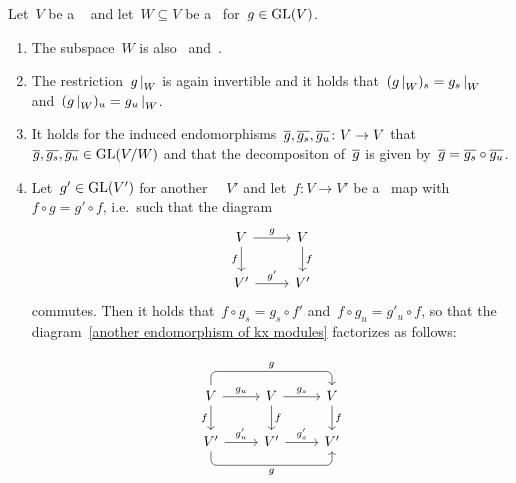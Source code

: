 \begin{lemma}
  \label{properties of mjcd}
  Let~$V$ be a {\fd}~{\kvs} and let~$W \subseteq V$ be a~ for~$g \in \operatorname{GL}(V)$.
  \begin{enumerate}
    \item
      The subspace~$W$ is also~ and~.
    \item
      \label{restriction of mjcd}
      The restriction~$\restrict{g}{W}$ is again invertible and it holds that~$(\restrict{g}{W})_s = \restrict{g_s}{W}$ and~$(\restrict{g}{W})_u = \restrict{g_u}{W}$.
    \item
      \label{induced mjcd}
      It holds for the induced endomorphisms~$\overline{g}, \overline{g_s}, \overline{g_u} \colon V \to V$ that~$\overline{g}, \overline{g_s}, \overline{g_u} \in \operatorname{GL}(V/W)$ and that the {\JCD} decompositon of~$\overline{g}$ is given by~$\overline{g} = \overline{g_s} \circ \overline{g_u}$.
    \item
      Let~$g' \in \operatorname{GL}(V')$ for another {\fd}~{\kvs}~$V'$ and let~$f \colon V \to V'$ be a~ map with~$f \circ g = g' \circ f$, i.e.\ such that the diagram
      \begin{equation}
        \label{another endomorphism of kx modules}
        \begin{tikzcd}
            V
            \arrow{r}[above]{g}
            \arrow{d}[left]{f}
          & V
            \arrow{d}[right]{f}
          \\
            V'
            \arrow{r}[above]{g'}
          & V'
        \end{tikzcd}
      \end{equation}
      commutes.
      Then it holds that~$f \circ g_s = g_s \circ f'$ and~$f \circ g_u = g'_u \circ f$, so that the diagram~\eqref{another endomorphism of kx modules} factorizes as follows:
      \[
        \begin{tikzcd}
            {}
          & {}
          & {}
          \\
            V
            \arrow[rounded corners,
              to path = { -- ([yshift=1em] \tikztostart.north)
                          -- ([yshift=1em] \tikztotarget.north) \tikztonodes
                          -- (\tikztotarget)
                        }
            ]{rr}[above]{g}
            \arrow{r}[above]{g_u}
            \arrow{d}[left]{f}
          & V
            \arrow{r}[above]{g_s}
            \arrow{d}[right]{f}
          & V
            \arrow{d}[right]{f}
          \\
            V'
            \arrow{r}[above]{g'_u}
            \arrow[rounded corners,
              to path = { -- ([yshift=-1em] \tikztostart.south)
                          -- ([yshift=-1em] \tikztotarget.south) \tikztonodes
                          -- (\tikztotarget)
                        }
            ]{rr}[below]{g}
          & V'
            \arrow{r}[above]{g'_s}
          & V'
        \end{tikzcd}
      \]
  \end{enumerate}
\end{lemma}


